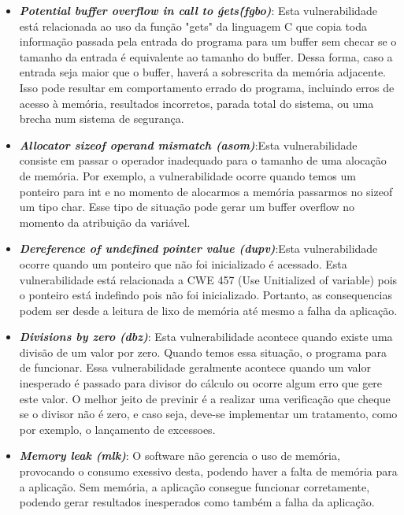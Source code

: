 \begin{itemize}
%

\item \textbf{\emph{Potential buffer overflow in call to \'gets\' (fgbo)}}: Esta vulnerabilidade está relacionada ao uso da função "gets" da linguagem C que copia toda informação passada pela entrada do programa para um buffer sem checar se o tamanho da entrada é equivalente ao tamanho do buffer. Dessa forma, caso a entrada seja maior que o buffer, haverá a sobrescrita da memória adjacente. Isso pode resultar em comportamento errado do programa, incluindo erros de acesso à memória, resultados incorretos, parada total do sistema, ou uma brecha num sistema de segurança.

%

\item \textbf{\emph{Allocator sizeof operand mismatch (asom)}}:Esta vulnerabilidade consiste em passar o operador inadequado para o tamanho de uma alocação de memória. Por exemplo, a vulnerabilidade ocorre quando temos um ponteiro para int e no momento de alocarmos a memória passarmos no sizeof um tipo char. Esse tipo de situação pode gerar um buffer overflow no momento da atribuição da variável.

%

\item \textbf{\emph{Dereference of undefined pointer value (dupv)}}:Esta vulnerabilidade ocorre quando um ponteiro que não foi inicializado é acessado. Esta vulnerabilidade está relacionada a CWE 457 (Use Unitialized of variable) pois o ponteiro está indefindo pois não foi inicializado. Portanto, as consequencias podem ser desde a leitura de lixo de memória até mesmo a falha da aplicação.

%

\item \textbf{\emph{Divisions by zero (dbz)}}: Esta vulnerabilidade acontece quando existe uma divisão de um valor por zero. Quando temos essa situação, o programa para de funcionar. Essa vulnerabilidade geralmente acontece quando um valor inesperado é passado para divisor do cálculo ou ocorre algum erro que gere este valor. O melhor jeito de previnir é a realizar uma verificação que cheque se o divisor não é zero, e caso seja, deve-se implementar um tratamento, como por exemplo, o lançamento de excessoes.

%

\item \textbf{\emph{Memory leak (mlk)}}: O software não gerencia o uso de memória, provocando o consumo exessivo desta, podendo haver a falta de memória para a aplicação. Sem memória, a aplicação consegue funcionar corretamente, podendo gerar resultados inesperados como também a falha da aplicação.


\end{itemize}
